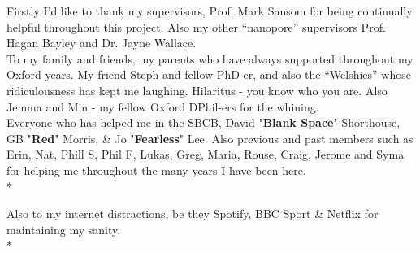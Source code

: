 \begin{acknowledgements}

Firstly I'd like to thank my supervisors, Prof. Mark Sansom for being continually helpful throughout this project. Also my other ``nanopore'' supervisors Prof. Hagan Bayley and Dr. Jayne Wallace. \\

To my family and friends, my parents who have always supported throughout my Oxford years. My friend Steph and fellow PhD-er, and also the ``Welshies'' whose ridiculousness has kept me laughing. Hilaritus - you know who you are.  Also Jemma and Min - my fellow Oxford DPhil-ers for the whining.\\

Everyone who has helped me in the SBCB, David "\textbf{Blank Space}" Shorthouse, GB "\textbf{Red}" Morris, \& Jo "\textbf{Fearless}" Lee. Also previous and past members such as Erin, Nat, Phill S, Phil F, Lukas, Greg, Maria, Rouse, Craig, Jerome and Syma for helping me throughout the many years I have been here. \\*

Also to my internet distractions, be they Spotify, BBC Sport \& Netflix for maintaining my sanity. \\* 

\end{acknowledgements}

